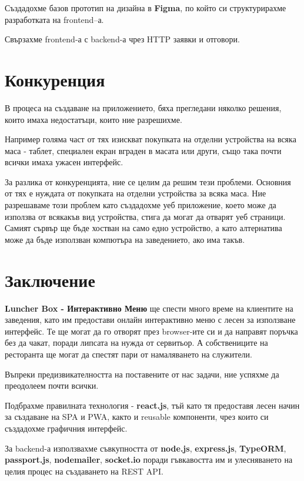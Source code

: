 \documentclass[a4paper]{article}
\begin{document}
\begin{Large}
Създадохме базов прототип на дизайна в \textbf{Figma}, по който си структурирахме разработката на frontend–а.

Свързахме frontend-а с backend-а чрез HTTP заявки и отговори.

\newpage

\section{Конкуренция}

В процеса на създаване на приложението, бяха прегледани няколко решения, които имаха недостатъци, които ние разрешихме. 

Например голяма част от тях изискват покупката на отделни устройства на всяка маса - таблет, специален екран вграден в масата или други, също така почти всички имаха ужасен интерфейс. 

За разлика от конкуренцията, ние се целим да решим тези проблеми. Основния от тях е нуждата от покупката на отделни устройства за всяка маса. Ние разрешаваме този проблем като създадохме уеб приложение, което може да използва от всякакъв вид устройства, стига да могат да отварят уеб страници. Самият сървър ще бъде хостван на само едно устройство, а като алтернатива може да бъде използван компютъра на заведението, ако има такъв.



\newpage 

\section{Заключение}

\textbf{Luncher Box - Интерактивно Меню} ще спести много време на клиентите на заведения, като им предостави онлайн интерактивно меню с лесен за използване интерфейс.  Те ще могат да го отворят през browser-ите си и да направят поръчка без да чакат, поради липсата на нужда от сервитьор. А собствениците на ресторанта ще могат да спестят пари от намаляването на служители.

Въпреки предизвикателността на поставените от нас задачи, ние успяхме да преодолеем почти всички. 

Подбрахме правилната технология - \textbf{react.js}, тъй като тя предоставя лесен начин за създаване на SPA и PWA, както и reusable компоненти, чрез които си създадохме графичния интерфейс. 

За backend-а използвахме съвкупността от  \textbf{node.js}, \textbf{express.js}, \textbf{TypeORM}, \textbf{passport.js}, \textbf{nodemailer}, \textbf{socket.io} поради гъвкавостта им и улесняването на целия процес на създаването на REST API. 


\end{Large}
\end{document}

